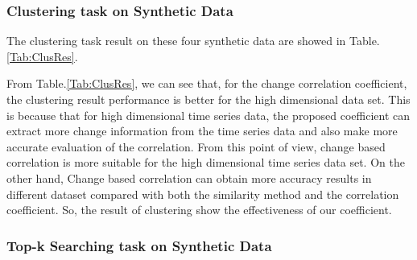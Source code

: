 \subsubsection{Clustering task on Synthetic Data}

The clustering task result on these four synthetic data are showed in Table.\ref{Tab:ClusRes}.

From Table.\ref{Tab:ClusRes}, we can see that, for the change correlation coefficient, the clustering result performance is better for the high dimensional data set.
This is because that for high dimensional time series data, the proposed coefficient can extract more change information from the time series data and also make more accurate evaluation of the correlation. 
From this point of view, change based correlation is more suitable for the high dimensional time series data set.
On the other hand, Change based correlation can obtain more accuracy results in different dataset compared with both the similarity method and the correlation coefficient. So, the result of clustering show the effectiveness of our coefficient.

\subsubsection{Top-k Searching task on Synthetic Data}

